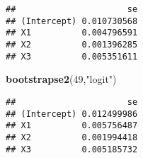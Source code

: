 \documentclass[]{article}
\newenvironment{Shaded}{\begin{snugshade}}{\end{snugshade}}
\newcommand{\KeywordTok}[1]{\textcolor[rgb]{0.13,0.29,0.53}{\textbf{#1}}}
\newcommand{\DecValTok}[1]{\textcolor[rgb]{0.00,0.00,0.81}{#1}}
\newcommand{\StringTok}[1]{\textcolor[rgb]{0.31,0.60,0.02}{#1}}
\newcommand{\NormalTok}[1]{#1}
\begin{document}
\begin{verbatim}
##                      se
## (Intercept) 0.010730568
## X1          0.004796591
## X2          0.001396285
## X3          0.005351611
\end{verbatim}

\begin{Shaded}
\begin{Highlighting}[]
\KeywordTok{bootstrapse2}\NormalTok{(}\DecValTok{49}\NormalTok{,}\StringTok{"logit"}\NormalTok{)}
\end{Highlighting}
\end{Shaded}

\begin{verbatim}
##                      se
## (Intercept) 0.012499986
## X1          0.005756487
## X2          0.001994418
## X3          0.005185732
\end{verbatim}
\end{document}
